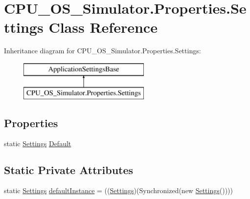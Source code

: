 \hypertarget{class_c_p_u___o_s___simulator_1_1_properties_1_1_settings}{}\section{C\+P\+U\+\_\+\+O\+S\+\_\+\+Simulator.\+Properties.\+Settings Class Reference}
\label{class_c_p_u___o_s___simulator_1_1_properties_1_1_settings}
Inheritance diagram for C\+P\+U\+\_\+\+O\+S\+\_\+\+Simulator.\+Properties.\+Settings\+:\begin{figure}[H]
\begin{center}
\leavevmode
\includegraphics[height=2.000000cm]{class_c_p_u___o_s___simulator_1_1_properties_1_1_settings}
\end{center}
\end{figure}
\subsection*{Properties}
\begin{DoxyCompactItemize}
\item 
static \hyperlink{class_c_p_u___o_s___simulator_1_1_properties_1_1_settings}{Settings} \hyperlink{class_c_p_u___o_s___simulator_1_1_properties_1_1_settings_a423993327c18a4dfede5f73981018fca}{Default}
\end{DoxyCompactItemize}
\subsection*{Static Private Attributes}
\begin{DoxyCompactItemize}
\item 
static \hyperlink{class_c_p_u___o_s___simulator_1_1_properties_1_1_settings}{Settings} \hyperlink{class_c_p_u___o_s___simulator_1_1_properties_1_1_settings_a9016562ea46f792bf8dc8d3e79dd36ae}{default\+Instance} = ((\hyperlink{class_c_p_u___o_s___simulator_1_1_properties_1_1_settings}{Settings})(Synchronized(new \hyperlink{class_c_p_u___o_s___simulator_1_1_properties_1_1_settings}{Settings}())))
\end{DoxyCompactItemize}


